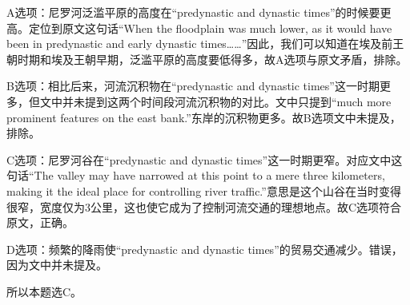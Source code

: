 \begin{blk}
\begin{nlz}
        A选项：尼罗河泛滥平原的高度在“predynastic and dynastic times”的时候要更高。定位到原文这句话“When the floodplain was much lower, as it would have been in predynastic and early dynastic times……”因此，我们可以知道在埃及前王朝时期和埃及王朝早期，泛滥平原的高度要低得多，故A选项与原文矛盾，排除。

        B选项：相比后来，河流沉积物在“predynastic and dynastic times”这一时期更多，但文中并未提到这两个时间段河流沉积物的对比。文中只提到“much more prominent features on the east bank.”东岸的沉积物更多。故B选项文中未提及，排除。

        C选项：尼罗河谷在“predynastic and dynastic times”这一时期更窄。对应文中这句话“The valley may have narrowed at this point to a mere three kilometers, making it the ideal place for controlling river traffic.”意思是这个山谷在当时变得很窄，宽度仅为3公里，这也使它成为了控制河流交通的理想地点。故C选项符合原文，正确。

        D选项：频繁的降雨使“predynastic and dynastic times”的贸易交通减少。错误，因为文中并未提及。

        所以本题选C。
    \end{nlz}
\end{blk}

